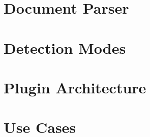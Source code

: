 \section{Document Parser}

\section{Detection Modes}

\section{Plugin Architecture}

\section{Use Cases}
